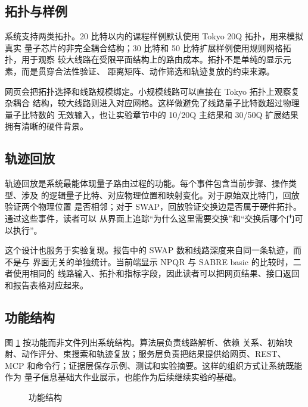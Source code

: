 

\subsection{拓扑与样例}

系统支持两类拓扑。20 比特以内的课程样例默认使用 Tokyo 20Q 拓扑，用来模拟真实
量子芯片的非完全耦合结构；30 比特和 50 比特扩展样例使用规则网格拓扑，用于观察
较大线路在受限平面结构上的路由成本。拓扑不是单纯的显示元素，而是贯穿合法性验证、
距离矩阵、动作筛选和轨迹复放的约束来源。

网页会把拓扑选择和线路规模绑定。小规模线路可以直接在 Tokyo 拓扑上观察复杂耦合
结构，较大线路则进入对应网格。这样做避免了线路量子比特数超过物理量子比特数的
无效输入，也让实验章节中的 10/20Q 主结果和 30/50Q 扩展结果拥有清晰的硬件背景。

\subsection{轨迹回放}

轨迹回放是系统最能体现量子路由过程的功能。每个事件包含当前步骤、操作类型、涉及
的逻辑量子比特、对应物理位置和映射变化。对于原始双比特门，回放验证两个物理位置
是否相邻；对于 SWAP，回放验证交换边是否属于硬件拓扑。通过这些事件，读者可以
从界面上追踪“为什么这里需要交换”和“交换后哪个门可以执行”。

这个设计也服务于实验复现。报告中的 SWAP 数和线路深度来自同一条轨迹，而不是与
界面无关的单独统计。当前端显示 NPQR 与 SABRE basic 的比较时，二者使用相同的
线路输入、拓扑和指标字段，因此读者可以把网页结果、接口返回和报告表格对应起来。

\subsection{功能结构}

图 \ref{fig:code-structure} 按功能而非文件列出系统结构。算法层负责线路解析、依赖
关系、初始映射、动作评分、束搜索和轨迹复放；服务层负责把结果提供给网页、REST、
MCP 和命令行；证据层保存示例、测试和实验摘要。这样的组织方式让系统既能作为
量子信息基础大作业展示，也能作为后续继续实验的基础。

\begin{figure}[H]
  \centering
  \resizebox{\linewidth}{!}{%
  
  }
  \caption{功能结构}
  \label{fig:code-structure}
\end{figure}
